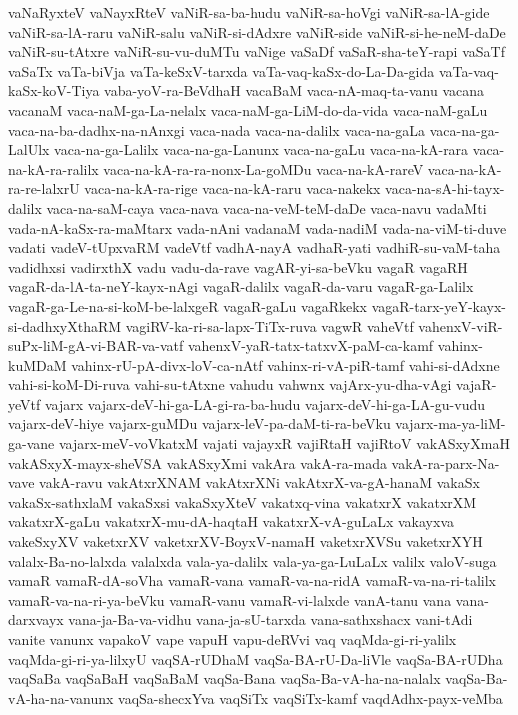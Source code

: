 {vaNaRyxteV
vaNayxRteV
vaNiR-sa-ba-hudu
vaNiR-sa-hoVgi
vaNiR-sa-lA-gide
vaNiR-sa-lA-raru
vaNiR-salu
vaNiR-si-dAdxre
vaNiR-side
vaNiR-si-he-neM-daDe
vaNiR-su-tAtxre
vaNiR-su-vu-duMTu
vaNige
vaSaDf
vaSaR-sha-teY-rapi
vaSaTf
vaSaTx
vaTa-biVja
vaTa-keSxV-tarxda
vaTa-vaq-kaSx-do-La-Da-gida
vaTa-vaq-kaSx-koV-Tiya
vaba-yoV-ra-BeVdhaH
vacaBaM
vaca-nA-maq-ta-vanu
vacana
vacanaM
vaca-naM-ga-La-nelalx
vaca-naM-ga-LiM-do-da-vida
vaca-naM-gaLu
vaca-na-ba-dadhx-na-nAnxgi
vaca-nada
vaca-na-dalilx
vaca-na-gaLa
vaca-na-ga-LalUlx
vaca-na-ga-Lalilx
vaca-na-ga-Lanunx
vaca-na-gaLu
vaca-na-kA-rara
vaca-na-kA-ra-ralilx
vaca-na-kA-ra-ra-nonx-La-goMDu
vaca-na-kA-rareV
vaca-na-kA-ra-re-lalxrU
vaca-na-kA-ra-rige
vaca-na-kA-raru
vaca-nakekx
vaca-na-sA-hi-tayx-dalilx
vaca-na-saM-caya
vaca-nava
vaca-na-veM-teM-daDe
vaca-navu
vadaMti
vada-nA-kaSx-ra-maMtarx
vada-nAni
vadanaM
vada-nadiM
vada-na-viM-ti-duve
vadati
vadeV-tUpxvaRM
vadeVtf
vadhA-nayA
vadhaR-yati
vadhiR-su-vaM-taha
vadidhxsi
vadirxthX
vadu
vadu-da-rave
vagAR-yi-sa-beVku
vagaR
vagaRH
vagaR-da-lA-ta-neY-kayx-nAgi
vagaR-dalilx
vagaR-da-varu
vagaR-ga-Lalilx
vagaR-ga-Le-na-si-koM-be-lalxgeR
vagaR-gaLu
vagaRkekx
vagaR-tarx-yeY-kayx-si-dadhxyXthaRM
vagiRV-ka-ri-sa-lapx-TiTx-ruva
vagwR
vaheVtf
vahenxV-viR-suPx-liM-gA-vi-BAR-va-vatf
vahenxV-yaR-tatx-tatxvX-paM-ca-kamf
vahinx-kuMDaM
vahinx-rU-pA-divx-loV-ca-nAtf
vahinx-ri-vA-piR-tamf
vahi-si-dAdxne
vahi-si-koM-Di-ruva
vahi-su-tAtxne
vahudu
vahwnx
vajArx-yu-dha-vAgi
vajaR-yeVtf
vajarx
vajarx-deV-hi-ga-LA-gi-ra-ba-hudu
vajarx-deV-hi-ga-LA-gu-vudu
vajarx-deV-hiye
vajarx-guMDu
vajarx-leV-pa-daM-ti-ra-beVku
vajarx-ma-ya-liM-ga-vane
vajarx-meV-voVkatxM
vajati
vajayxR
vajiRtaH
vajiRtoV
vakASxyXmaH
vakASxyX-mayx-sheVSA
vakASxyXmi
vakAra
vakA-ra-mada
vakA-ra-parx-Na-vave
vakA-ravu
vakAtxrXNAM
vakAtxrXNi
vakAtxrX-va-gA-hanaM
vakaSx
vakaSx-sathxlaM
vakaSxsi
vakaSxyXteV
vakatxq-vina
vakatxrX
vakatxrXM
vakatxrX-gaLu
vakatxrX-mu-dA-haqtaH
vakatxrX-vA-guLaLx
vakayxva
vakeSxyXV
vaketxrXV
vaketxrXV-BoyxV-namaH
vaketxrXVSu
vaketxrXYH
valalx-Ba-no-lalxda
valalxda
vala-ya-dalilx
vala-ya-ga-LuLaLx
valilx
valoV-suga
vamaR
vamaR-dA-soVha
vamaR-vana
vamaR-va-na-ridA
vamaR-va-na-ri-talilx
vamaR-va-na-ri-ya-beVku
vamaR-vanu
vamaR-vi-lalxde
vanA-tanu
vana
vana-darxvayx
vana-ja-Ba-va-vidhu
vana-ja-sU-tarxda
vana-sathxshacx
vani-tAdi
vanite
vanunx
vapakoV
vape
vapuH
vapu-deRVvi
vaq
vaqMda-gi-ri-yalilx
vaqMda-gi-ri-ya-lilxyU
vaqSA-rUDhaM
vaqSa-BA-rU-Da-liVle
vaqSa-BA-rUDha
vaqSaBa
vaqSaBaH
vaqSaBaM
vaqSa-Bana
vaqSa-Ba-vA-ha-na-nalalx
vaqSa-Ba-vA-ha-na-vanunx
vaqSa-shecxYva
vaqSiTx
vaqSiTx-kamf
vaqdAdhx-payx-veMba
}
